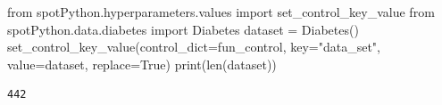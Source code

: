 \documentclass[
  letterpaper,
  DIV=11,
  numbers=noendperiod]{scrreprt}
\newenvironment{Shaded}{\begin{snugshade}}{\end{snugshade}}
\newcommand{\BuiltInTok}[1]{\textcolor[rgb]{0.00,0.23,0.31}{#1}}
\newcommand{\ImportTok}[1]{\textcolor[rgb]{0.00,0.46,0.62}{#1}}
\newcommand{\NormalTok}[1]{\textcolor[rgb]{0.00,0.23,0.31}{#1}}
\newcommand{\OperatorTok}[1]{\textcolor[rgb]{0.37,0.37,0.37}{#1}}
\newcommand{\StringTok}[1]{\textcolor[rgb]{0.13,0.47,0.30}{#1}}
\newcommand{\VariableTok}[1]{\textcolor[rgb]{0.07,0.07,0.07}{#1}}
\begin{document}
\begin{Shaded}
\begin{Highlighting}[]
\ImportTok{from}\NormalTok{ spotPython.hyperparameters.values }\ImportTok{import}\NormalTok{ set\_control\_key\_value}
\ImportTok{from}\NormalTok{ spotPython.data.diabetes }\ImportTok{import}\NormalTok{ Diabetes}
\NormalTok{dataset }\OperatorTok{=}\NormalTok{ Diabetes()}
\NormalTok{set\_control\_key\_value(control\_dict}\OperatorTok{=}\NormalTok{fun\_control,}
\NormalTok{                        key}\OperatorTok{=}\StringTok{"data\_set"}\NormalTok{,}
\NormalTok{                        value}\OperatorTok{=}\NormalTok{dataset,}
\NormalTok{                        replace}\OperatorTok{=}\VariableTok{True}\NormalTok{)}
\BuiltInTok{print}\NormalTok{(}\BuiltInTok{len}\NormalTok{(dataset))}
\end{Highlighting}
\end{Shaded}

\begin{verbatim}
442
\end{verbatim}
\end{document}
